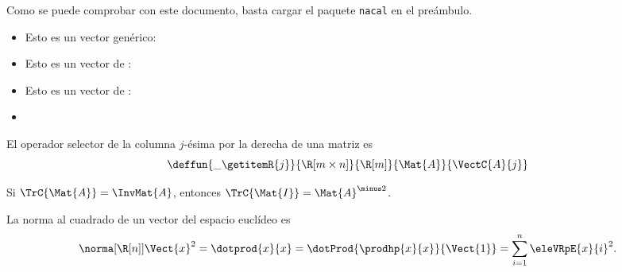 \documentclass{article}
\begin{document}
Como se puede comprobar con este documento, basta cargar el paquete
\texttt{nacal} en el preámbulo.
\bigskip

\begin{itemize}
\item Esto es un vector genérico:\; 
\item Esto es un vector de \R[n]:\; 
\item Esto es un vector de \R[m\times n]:\; 
\item {}
\end{itemize}

El operador selector de la columna $j$-ésima por la derecha de una matriz es
\begin{displaymath}
  \deffun{\_\getitemR{j}}{\R[m\times n]}{\R[m]}{\Mat{A}}{\VectC{A}{j}}
\end{displaymath}


Si $\TrC{\Mat{A}}=\InvMat{A}$, entonces $\TrC{\Mat{I}}=\Mat{A}^{\minus2}$.
\bigskip

La norma al cuadrado de un vector del espacio euclídeo \R[n] es
\[
  \norma[\R[n]]{\Vect{x}}^2=
  \dotprod{x}{x}=
  \dotProd{\prodhp{x}{x}}{\Vect{1}}=
  \sum_{i=1}^n\eleVRpE{x}{i}^2.
\]
\end{document}
